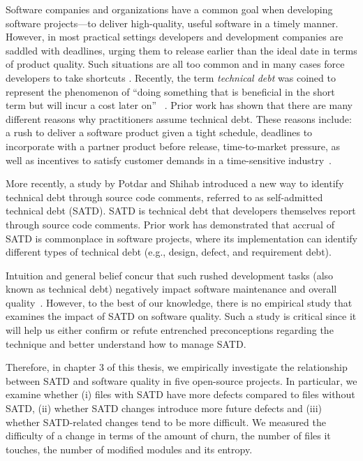 
Software companies and organizations have a common goal when developing software projects---to deliver high-quality, useful software in a timely manner. However, in most practical settings developers and development companies are saddled with deadlines, urging them to release earlier than the ideal date in terms of product quality. Such situations are all too common and in many cases force developers to take shortcuts \cite{kruchten2013technical} \cite{seaman2015technical}. Recently, the term \emph{technical debt} was coined to represent the phenomenon of ``doing something that is beneficial in the short term but will incur a cost later on''~ \cite{cunningham1993wycash}. Prior work has shown that there are many different reasons why practitioners assume technical debt. These reasons include: a rush to deliver a software product given a tight schedule, deadlines to incorporate with a partner product before release, time-to-market pressure, as well as incentives to satisfy customer demands in a time-sensitive industry~\cite{lim2012balancing}.


More recently, a study by Potdar and Shihab \cite{ICSM_PotdarS14} introduced a new way to identify technical debt through source code comments, referred to as self-admitted technical debt (SATD). SATD is technical debt that developers themselves report through source code comments. Prior work \cite{MTD15p9} has demonstrated that accrual of SATD is commonplace in software projects, where its implementation can identify different types of technical debt (e.g., design, defect, and requirement debt).\par

Intuition and general belief concur that such rushed development tasks (also known as technical debt) negatively impact software maintenance and overall quality~\cite{zazworka2011investigating,spinola2013investigating,GuoSGCTSSS11,seaman2015technical,kruchten2013technical}. However, to the best of our knowledge, there is no empirical study that examines the impact of SATD on software quality. Such a study is critical since it will help us either confirm or refute entrenched preconceptions regarding the technique and better understand how to manage SATD.\par

Therefore, in chapter 3 of this thesis, we empirically investigate the relationship between SATD and software quality in five open-source projects. In particular, we examine whether (i) files with SATD have more defects compared to files without SATD, (ii) whether SATD changes introduce more future defects and (iii) whether SATD-related changes tend to be more difficult. We measured the difficulty of a change in terms of the amount of churn, the number of files it touches, the number of modified modules and its entropy. \par

